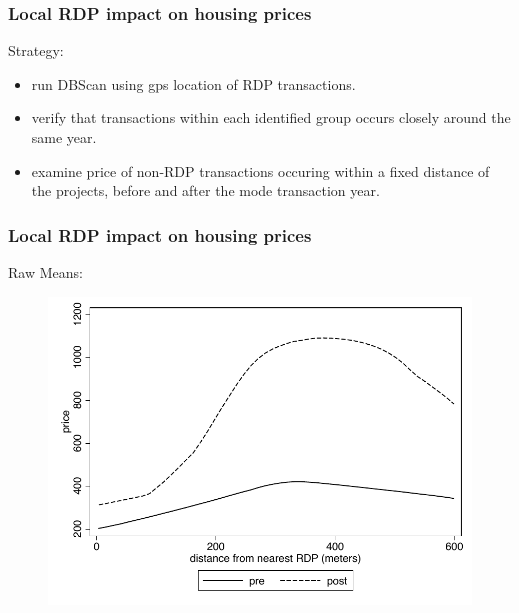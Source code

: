 \documentclass[aspectratio=149]{beamer}
\begin{document}
\begin{frame}
\frametitle{Local RDP impact on housing prices}

Strategy:
\begin{itemize}
\item run DBScan using gps location of RDP transactions.
\item verify that transactions within each identified group occurs closely around the same year. 
\item examine price of non-RDP transactions occuring within a fixed distance of the projects, before and after the mode transaction year.
\end{itemize}


\end{frame}


\begin{frame}
\frametitle{Local RDP impact on housing prices}
Raw Means:
\begin{center}
\begin{figure}
\includegraphics[scale=0.7]{raw_plot2.pdf}
\end{figure}
\end{center}
\end{frame}

\end{document}
